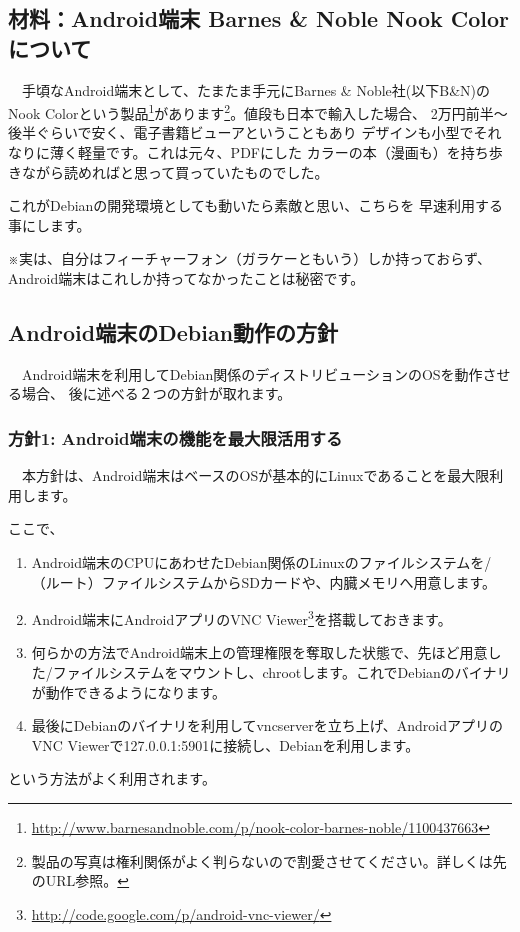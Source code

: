 \documentclass[mingoth,a4paper]{jsarticle}
\begin{document}
\subsection{材料：Android端末 Barnes \& Noble Nook Colorについて}

　手頃なAndroid端末として、たまたま手元にBarnes \& Noble社(以下B\&N)の
Nook Colorという製品\footnote{\url{http://www.barnesandnoble.com/p/nook-color-barnes-noble/1100437663}}があります\footnote{製品の写真は権利関係がよく判らないので割愛させてください。詳しくは先のURL参照。}。値段も日本で輸入した場合、
2万円前半〜後半ぐらいで安く、電子書籍ビューアということもあり
デザインも小型でそれなりに薄く軽量です。これは元々、PDFにした
カラーの本（漫画も）を持ち歩きながら読めればと思って買っていたものでした。

これがDebianの開発環境としても動いたら素敵と思い、こちらを
早速利用する事にします。

※実は、自分はフィーチャーフォン（ガラケーともいう）しか持っておらず、Android端末はこれしか持ってなかったことは秘密です。

\subsection{Android端末のDebian動作の方針}

　Android端末を利用してDebian関係のディストリビューションのOSを動作させる場合、
後に述べる２つの方針が取れます。

\subsubsection{方針1: Android端末の機能を最大限活用する}

　本方針は、Android端末はベースのOSが基本的にLinuxであることを最大限利用します。

ここで、
\begin{enumerate}
\item Android端末のCPUにあわせたDebian関係のLinuxのファイルシステムを/（ルート）ファイルシステムからSDカードや、内臓メモリへ用意します。
\item Android端末にAndroidアプリのVNC Viewer\footnote{\url{http://code.google.com/p/android-vnc-viewer/}}を搭載しておきます。
\item 何らかの方法でAndroid端末上の管理権限を奪取した状態で、先ほど用意した/ファイルシステムをマウントし、chrootします。これでDebianのバイナリが動作できるようになります。
\item 最後にDebianのバイナリを利用してvncserverを立ち上げ、AndroidアプリのVNC Viewerで127.0.0.1:5901に接続し、Debianを利用します。
\end{enumerate}
という方法がよく利用されます。
\end{document}
